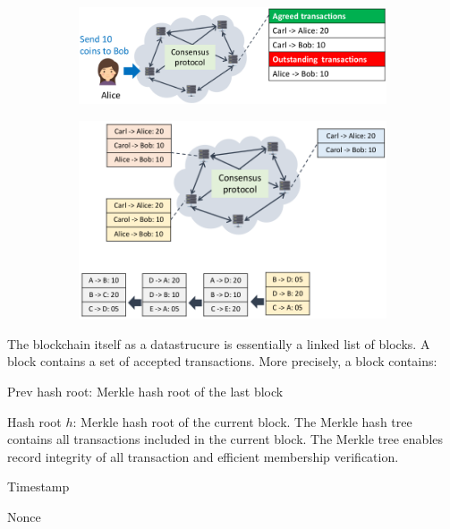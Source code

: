 \documentclass[11pt,oneside,a4paper]{article}
\begin{document}
\vspace{-\topsep}
\begin{figure}[hb]
	\centering
	\begin{subfigure}[t]{.5\textwidth}
		\centering
		\includegraphics[width=1\linewidth]{figures/distributed_ledger_consensus}
		\label{fig:distributed_ledger_consensus}
	\end{subfigure}%
	\begin{subfigure}[t]{.5\textwidth}
		\centering
		\includegraphics[width=0.6\linewidth]{figures/blockchain_overview}
		\label{fig:blockchain_overview}
	\end{subfigure}
\end{figure}
\vspace{-\topsep}

The blockchain itself as a datastrucure is essentially a linked list of blocks. A block contains a set of accepted transactions. More precisely, a block contains:

\begin{compactitem}
	\item Prev hash root: Merkle hash root of the last block
	\item Hash root $h$: Merkle hash root of the current block. The Merkle hash tree contains all transactions included in the current block. The Merkle tree enables record integrity of all transaction and efficient membership verification.
	\item Timestamp
	\item Nonce
\end{compactitem}
\end{document}
